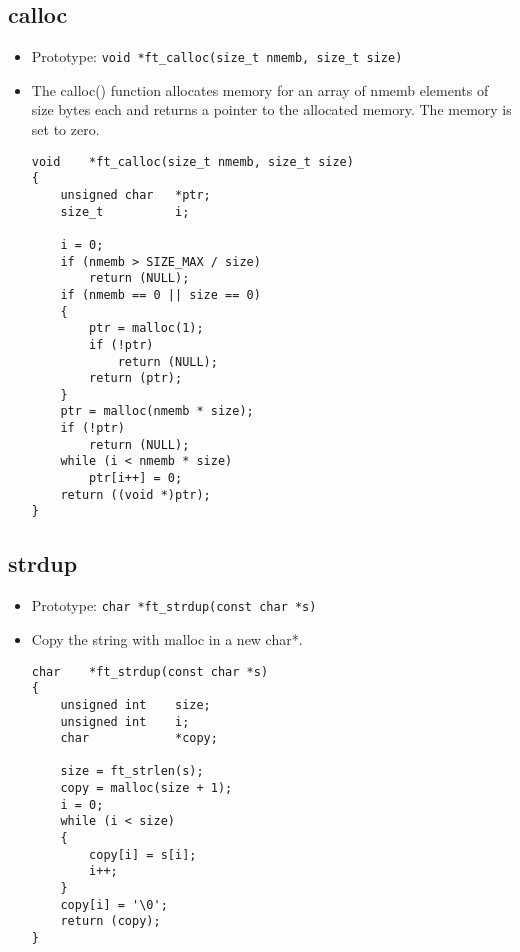 \documentclass{article}
\begin{document}
	\subsection{calloc}
		\begin{itemize}[label=$\rightarrow$]
			\item Prototype: \texttt{void    *ft\_calloc(size\_t nmemb, size\_t size)}
			\item The calloc() function allocates memory for an array of  nmemb  elements of size bytes each and returns a pointer to the allocated memory. The memory is set to zero.
			\begin{verbatim}
void	*ft_calloc(size_t nmemb, size_t size)
{
	unsigned char	*ptr;
	size_t			i;

	i = 0;
	if (nmemb > SIZE_MAX / size)
		return (NULL);
	if (nmemb == 0 || size == 0)
	{
		ptr = malloc(1);
		if (!ptr)
			return (NULL);
		return (ptr);
	}
	ptr = malloc(nmemb * size);
	if (!ptr)
		return (NULL);
	while (i < nmemb * size)
		ptr[i++] = 0;
	return ((void *)ptr);
}

			\end{verbatim}
		\end{itemize}
	
	\subsection{strdup}
		\begin{itemize}[label=$\rightarrow$]
			\item Prototype: \texttt{char    *ft\_strdup(const char *s)}
			\item Copy the string with malloc in a new char*.
			\begin{verbatim}
char    *ft_strdup(const char *s)                                               
{                                                                               
    unsigned int    size;                                                       
    unsigned int    i;                                                          
    char            *copy;                                                      
                                                                                
    size = ft_strlen(s);                                                        
    copy = malloc(size + 1);                                                    
    i = 0;                                                                      
    while (i < size)                                                            
    {                                                                           
        copy[i] = s[i];                                                         
        i++;                                                                    
    }                                                                           
    copy[i] = '\0';                                                             
    return (copy);                                                              
} 
			\end{verbatim}
		\end{itemize}
\end{document}
